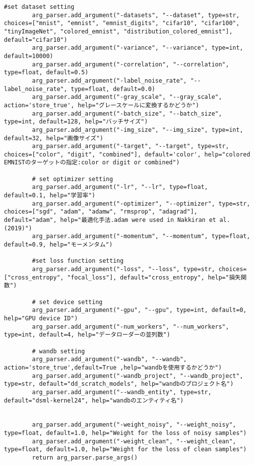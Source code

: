 \begin{lstlisting}[style=pythonstyle, caption={Program Example}]
        #set dataset setting
        arg_parser.add_argument("-datasets", "--dataset", type=str, choices=["mnist", "emnist", "emnist_digits", "cifar10", "cifar100", "tinyImageNet", "colored_emnist", "distribution_colored_emnist"], default="cifar10")
        arg_parser.add_argument("-variance", "--variance", type=int, default=10000)
        arg_parser.add_argument("-correlation", "--correlation", type=float, default=0.5)
        arg_parser.add_argument("-label_noise_rate", "--label_noise_rate", type=float, default=0.0) 
        arg_parser.add_argument("-gray_scale", "--gray_scale", action='store_true', help="グレースケールに変換するかどうか")
        arg_parser.add_argument("-batch_size", "--batch_size", type=int, default=128, help="バッチサイズ")
        arg_parser.add_argument("-img_size", "--img_size", type=int, default=32, help="画像サイズ")
        arg_parser.add_argument("-target", "--target", type=str, choices=["color", "digit", "combined"], default='color', help="colored EMNISTのターゲットの指定:color or digit or combined")
        
        # set optimizer setting
        arg_parser.add_argument("-lr", "--lr", type=float, default=0.1, help="学習率")
        arg_parser.add_argument("-optimizer", "--optimizer", type=str, choices=["sgd", "adam", "adamw", "rmsprop", "adagrad"], default="adam", help="最適化手法.adam were used in Nakkiran et al. (2019)")
        arg_parser.add_argument("-momentum", "--momentum", type=float, default=0.9, help="モーメンタム")
        
        #set loss function setting
        arg_parser.add_argument("-loss", "--loss", type=str, choices=["cross_entropy", "focal_loss"], default="cross_entropy", help="損失関数")
        
        # set device setting
        arg_parser.add_argument("-gpu", "--gpu", type=int, default=0, help="GPU device ID")
        arg_parser.add_argument("-num_workers", "--num_workers", type=int, default=4, help="データローダーの並列数")
        
        # wandb setting
        arg_parser.add_argument("-wandb", "--wandb", action='store_true',default=True ,help="wandbを使用するかどうか")
        arg_parser.add_argument("-wandb_project", "--wandb_project", type=str, default="dd_scratch_models", help="wandbのプロジェクト名")
        arg_parser.add_argument("--wandb_entity", type=str, default="dsml-kernel24", help="wandbのエンティティ名")
        
        
        arg_parser.add_argument("-weight_noisy", "--weight_noisy", type=float, default=1.0, help="Weight for the loss of noisy samples")
        arg_parser.add_argument("-weight_clean", "--weight_clean", type=float, default=1.0, help="Weight for the loss of clean samples")
        return arg_parser.parse_args()
    

\end{lstlisting}
